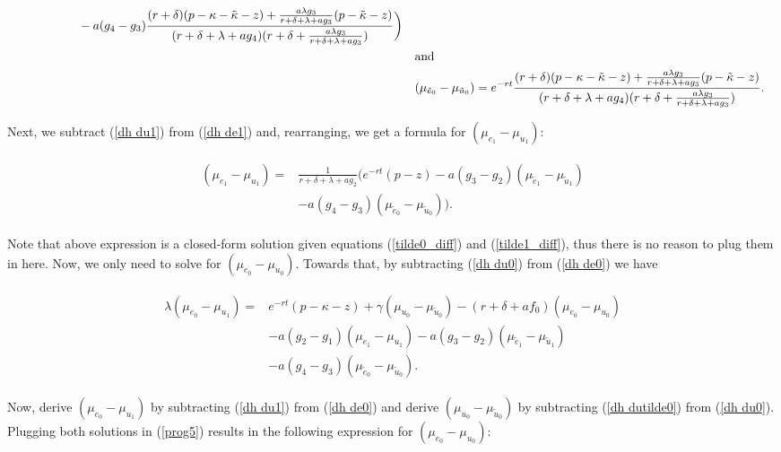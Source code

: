 \documentclass[12pt]{article} %
\theoremstyle{definition}
\begin{document}
\begin{appendix}
\begin{fleqn}
\begin{align}
\begin{split}
& \hspace{2cm} -a(g_4-g_3)\frac{(r+\delta)(p-\kappa-\tilde{\kappa}-z)+\frac{a\lambda g_3}{r+\delta+\lambda+ag_3}(p-\tilde{\kappa}-z)}{(r+\delta+\lambda+ag_4)(r+\delta+\frac{a\lambda g_3}{r+\delta+\lambda+ag_3})}\biggr) \label{tilde1_diff} 
\end{split} \\
&\text{and} \notag \\
& (\mu_{\tilde{e}_0}-\mu_{\tilde{u}_0})=e^{-rt}\frac{(r+\delta)(p-\kappa-\tilde{\kappa}-z)+\frac{a\lambda g_3}{r+\delta+\lambda+ag_3}(p-\tilde{\kappa}-z)}{(r+\delta+\lambda+ag_4)(r+\delta+\frac{a\lambda g_3}{r+\delta+\lambda+ag_3})}. \label{tilde0_diff}
\end{align}
\end{fleqn}
Next, we subtract (\ref{dh du1}) from (\ref{dh de1}) and, rearranging, we get a formula for $(\mu_{e_1}-\mu_{u_1})$:
\begin{fleqn}
\begin{align}
\begin{split}
 (\mu_{e_1}-\mu_{u_1})= & \frac{1}{r+\delta+\lambda+ag_2}\bigl(e^{-rt}(p-z)-a(g_3-g_2)(\mu_{\tilde{e}_1}-\mu_{\tilde{u}_1}) \\
& -a(g_4-g_3)(\mu_{\tilde{e}_0}-\mu_{\tilde{u}_0})\bigr). \label{1_diff} 
\end{split}
\end{align}
\end{fleqn}

\newpage

\noindent Note that above expression is a closed-form solution given equations (\ref{tilde0_diff}) and (\ref{tilde1_diff}), thus there is no reason to plug them in here. Now, we only need to solve for $(\mu_{e_0}-\mu_{u_0})$. Towards that, by subtracting (\ref{dh du0}) from (\ref{dh de0}) we have

\begin{fleqn}
\begin{align}
\begin{split}
\lambda(\mu_{e_0}-\mu_{u_1}) =& e^{-rt}(p-\kappa-z)+\gamma(\mu_{u_0}-\mu_{\tilde{u}_0}) - (r+\delta+af_0)(\mu_{e_0}-\mu_{u_0}) \\
& -a(g_2-g_1)(\mu_{e_1}-\mu_{u_1})-a(g_3-g_2)(\mu_{\tilde{e}_1}-\mu_{\tilde{u}_1})\\
& -a(g_4-g_3)(\mu_{\tilde{e}_0}-\mu_{\tilde{u}_0}). \label{prog5}
\end{split}
\end{align}
\end{fleqn}
Now, derive $(\mu_{e_0}-\mu_{u_1})$ by subtracting (\ref{dh du1}) from (\ref{dh de0}) and derive $(\mu_{u_0}-\mu_{\tilde{u}_0})$ by subtracting (\ref{dh dutilde0}) from (\ref{dh du0}). Plugging both solutions in (\ref{prog5}) results in the following expression for $(\mu_{e_0}-\mu_{u_0})$:


\end{appendix}
\end{document}
